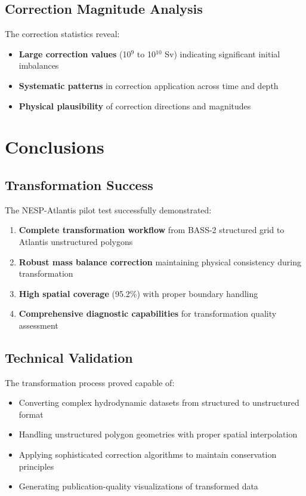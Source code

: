 \documentclass[12pt,a4paper,twoside,times,sky,formal]{csiroreport2017}
\begin{document}
\subsection{Correction Magnitude Analysis}

The correction statistics reveal:
\begin{itemize}
\item \textbf{Large correction values} (10$^9$ to 10$^{10}$ Sv) indicating significant initial imbalances
\item \textbf{Systematic patterns} in correction application across time and depth
\item \textbf{Physical plausibility} of correction directions and magnitudes
\end{itemize}

\section{Conclusions}

\subsection{Transformation Success}

The NESP-Atlantis pilot test successfully demonstrated:

\begin{enumerate}
\item \textbf{Complete transformation workflow} from BASS-2 structured grid to Atlantis unstructured polygons
\item \textbf{Robust mass balance correction} maintaining physical consistency during transformation
\item \textbf{High spatial coverage} (95.2\%) with proper boundary handling
\item \textbf{Comprehensive diagnostic capabilities} for transformation quality assessment
\end{enumerate}

\subsection{Technical Validation}

The transformation process proved capable of:
\begin{itemize}
\item Converting complex hydrodynamic datasets from structured to unstructured format
\item Handling unstructured polygon geometries with proper spatial interpolation
\item Applying sophisticated correction algorithms to maintain conservation principles
\item Generating publication-quality visualizations of transformed data
\end{itemize}
\end{document}
